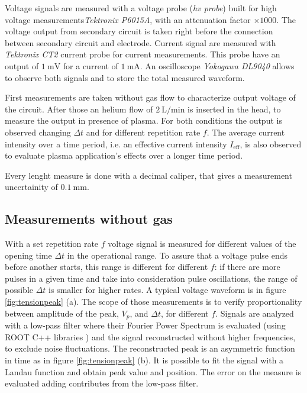 Voltage signals are measured with a voltage probe (\emph{hv probe}) built for high voltage measurements\emph{Tektronix P6015A}, with an attenuation factor $\times 1000$. The voltage output from secondary circuit is taken right before the connection between secondary circuit and electrode.
Current signal are measured with \emph{Tektronix CT2} current probe for current measurements. This probe have an output of $\SI{1}{\milli\volt}$ for a current of $\SI{1}{\milli\ampere}$.
An oscilloscope \emph{Yokogawa DL9040} allows to observe both signals and to store the total measured waveform.

First measurements are taken without gas flow to characterize output voltage of the circuit. After those an helium flow of $\SI{2}{\liter/\minute}$ is inserted in the head, to measure the output in presence of plasma. For both conditions the output is observed changing $\Delta t$ and for different repetition rate $f$. The average current intensity over a time period, i.e. an effective current intensity $I_{\text{eff}}$, is also observed to evaluate plasma application's effects over a longer time period.

Every lenght measure is done with a decimal caliper, that gives a measurement uncertainity of $\SI{0.1}{\milli\meter}$.

\subsection{Measurements without gas}
With a set repetition rate $f$ voltage signal is measured for different values of the opening time $\Delta t$ in the operational range.
To assure that a voltage pulse ends before another starts, this range is different for different $f$: if there are more pulses in a given time and take into consideration pulse oscillations, the range of possible $\Delta t$ is smaller for higher rates.
A typical voltage waveform is in figure \ref{fig:tensionpeak} (a). The scope of those measurements is to verify proportionality between amplitude of the peak, $V_p$, and $\Delta t$, for different $f$. Signals are analyzed with a low-pass filter where their Fourier Power Spectrum is evaluated (using ROOT C++ libraries \cite{ROOT:fft}) and the signal reconstructed without higher frequencies, to exclude noise fluctuations. The reconstructed peak is an asymmetric function in time as in figure \ref{fig:tensionpeak} (b). It is possible to fit the signal with a Landau function \cite{ROOT:landau} and obtain peak value and position.
The error on the measure is evaluated adding contributes from the low-pass filter.

